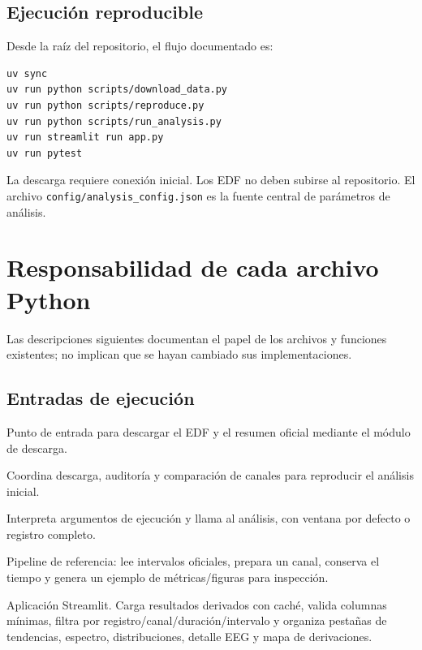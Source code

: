 \documentclass[11pt,a4paper]{article}
\begin{document}
\subsection{Ejecución reproducible}
Desde la raíz del repositorio, el flujo documentado es:
\begin{verbatim}
uv sync
uv run python scripts/download_data.py
uv run python scripts/reproduce.py
uv run python scripts/run_analysis.py
uv run streamlit run app.py
uv run pytest
\end{verbatim}
La descarga requiere conexión inicial. Los EDF no deben subirse al repositorio. El archivo \texttt{config/analysis\_config.json} es la fuente central de parámetros de análisis.

\section{Responsabilidad de cada archivo Python}
Las descripciones siguientes documentan el papel de los archivos y funciones existentes; no implican que se hayan cambiado sus implementaciones.

\subsection{Entradas de ejecución}
\begin{description}[leftmargin=!,labelwidth=4.0cm,style=nextline]
\item[\texttt{scripts/download\_data.py}] Punto de entrada para descargar el EDF y el resumen oficial mediante el módulo de descarga.
\item[\texttt{scripts/reproduce.py}] Coordina descarga, auditoría y comparación de canales para reproducir el análisis inicial.
\item[\texttt{scripts/run\_analysis.py}] Interpreta argumentos de ejecución y llama al análisis, con ventana por defecto o registro completo.
\item[\texttt{src/eeg\_epilepsy/procesamiento.py}] Pipeline de referencia: lee intervalos oficiales, prepara un canal, conserva el tiempo y genera un ejemplo de métricas/figuras para inspección.
\item[\texttt{app.py}] Aplicación Streamlit. Carga resultados derivados con caché, valida columnas mínimas, filtra por registro/canal/duración/intervalo y organiza pestañas de tendencias, espectro, distribuciones, detalle EEG y mapa de derivaciones.
\end{description}
\end{document}
